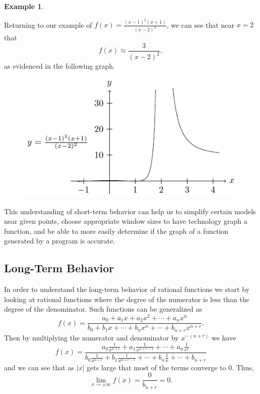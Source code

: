 \documentclass[
]{book}
\theoremstyle{definition}
\theoremstyle{definition}
\newtheorem{example}{Example}[chapter]
\theoremstyle{definition}
\theoremstyle{definition}
\theoremstyle{remark}
\begin{document}
\begin{example}
\protect\hypertarget{exm:unlabeled-div-135}{}\label{exm:unlabeled-div-135}

Returning to our example of \(f(x)=\frac{(x-1)^2(x+1)}{(x-2)^2}\), we can see that near \(x=2\) that
\[f(x) \approx \frac{3}{(x-2)^2},\] as evidenced in the following graph.

\begin{figure}

{\centering \includegraphics[width=0.5\linewidth]{tikz/rational2} 

}

\end{figure}

\end{example}

This understanding of short-term behavior can help us to simplify certain models near given points, choose appropriate window sizes to have technology graph a function, and be able to more easily determine if the graph of a function generated by a program is accurate.

\hypertarget{long-term-behavior-1}{%
\subsection{Long-Term Behavior}\label{long-term-behavior-1}}

In order to understand the long-term behavior of rational functions we start by looking at rational functions where the degree of the numerator is less than the degree of the denominator. Such functions can be generalized as
\[f(x) = \frac{ a_0 + a_1 x + a_2 x^2 + \cdots + a_n x^n}{b_0 + b_1 x + \cdots + b_n x^n +\cdots +b_{n+r}x^{n+r}}.\]
Then by multiplying the numerator and denominator by \(x^{-(n+r)}\) we have
\[f(x) = \frac{ a_0\frac{1}{x^{n+r}} + a_1 \frac{1}{x^{n+r-1}} + \cdots + a_n \frac{1}{x^{r}}}{b_0 \frac{1}{x^{n+r}} + b_1 \frac{1}{x^{n+r-1}} + \cdots + b_n \frac{1}{x} +\cdots +b_{n+r}}\] and we can see that as \(|x|\) gets large that most of the terms converge to \(0\). Thus,
\[\lim_{x\rightarrow \pm \infty} f(x) = \frac{0}{b_{n+r}} = 0.\]
\end{document}
